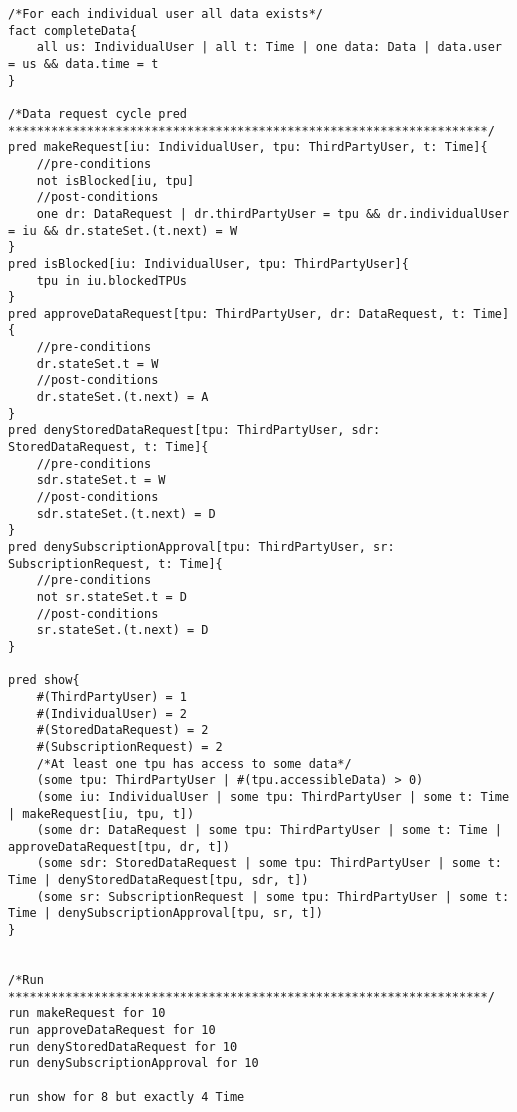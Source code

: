 \begin{lstlisting}
/*For each individual user all data exists*/
fact completeData{
	all us: IndividualUser | all t: Time | one data: Data | data.user = us && data.time = t
}

/*Data request cycle pred
*******************************************************************/
pred makeRequest[iu: IndividualUser, tpu: ThirdPartyUser, t: Time]{
	//pre-conditions
	not isBlocked[iu, tpu]
	//post-conditions
	one dr: DataRequest | dr.thirdPartyUser = tpu && dr.individualUser = iu && dr.stateSet.(t.next) = W
}
pred isBlocked[iu: IndividualUser, tpu: ThirdPartyUser]{
	tpu in iu.blockedTPUs
}
pred approveDataRequest[tpu: ThirdPartyUser, dr: DataRequest, t: Time]{
	//pre-conditions
	dr.stateSet.t = W
	//post-conditions
	dr.stateSet.(t.next) = A
}
pred denyStoredDataRequest[tpu: ThirdPartyUser, sdr: StoredDataRequest, t: Time]{
	//pre-conditions
	sdr.stateSet.t = W
	//post-conditions
	sdr.stateSet.(t.next) = D
}
pred denySubscriptionApproval[tpu: ThirdPartyUser, sr: SubscriptionRequest, t: Time]{
	//pre-conditions
	not sr.stateSet.t = D
	//post-conditions
	sr.stateSet.(t.next) = D
}

pred show{
 	#(ThirdPartyUser) = 1
	#(IndividualUser) = 2
	#(StoredDataRequest) = 2
	#(SubscriptionRequest) = 2
	/*At least one tpu has access to some data*/
	(some tpu: ThirdPartyUser | #(tpu.accessibleData) > 0)
	(some iu: IndividualUser | some tpu: ThirdPartyUser | some t: Time | makeRequest[iu, tpu, t])
	(some dr: DataRequest | some tpu: ThirdPartyUser | some t: Time | approveDataRequest[tpu, dr, t])
	(some sdr: StoredDataRequest | some tpu: ThirdPartyUser | some t: Time | denyStoredDataRequest[tpu, sdr, t])
	(some sr: SubscriptionRequest | some tpu: ThirdPartyUser | some t: Time | denySubscriptionApproval[tpu, sr, t])
}


/*Run
*******************************************************************/
run makeRequest for 10
run approveDataRequest for 10
run denyStoredDataRequest for 10
run denySubscriptionApproval for 10 

run show for 8 but exactly 4 Time

\end{lstlisting}
